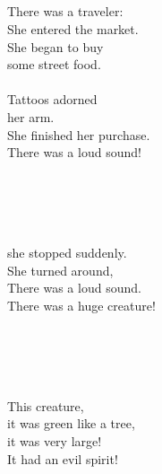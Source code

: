 \documentclass{ctexart}
\begin{document}
{
\noindent
\begin{minipage}[t]{5.75cm}
{\textCJKserif\large
  \\
  \\
  \\
  \\\\
  \hspace{0.15em}\\
  \\
  \\
  \\
  \scriptsize

  {There was a traveler:\\
  She entered the market.\\
  She began to buy\\
  some street food.}\\
  \\
  {Tattoos adorned\\
  her arm.\\
  She finished her purchase.\\
  There was a loud sound!}
}
\end{minipage}
\begin{minipage}[t]{5.75cm}
{\textCJKserif{}\large
  \\
  \\
  \\
  \\
  \scriptsize
  she stopped suddenly.\\
  She turned around,\\
  There was a loud sound.\\
  There was a huge creature!\\
}
\end{minipage}
\begin{minipage}[t]{5.75cm}
{\textCJKserif{}\large
  \\
  \\
  \\
  \\
  \scriptsize
  This creature, \\
  it was green like a tree,\\
  it was very large!\\
  It had an evil spirit!\\
}
\end{minipage}
}
\end{document}
